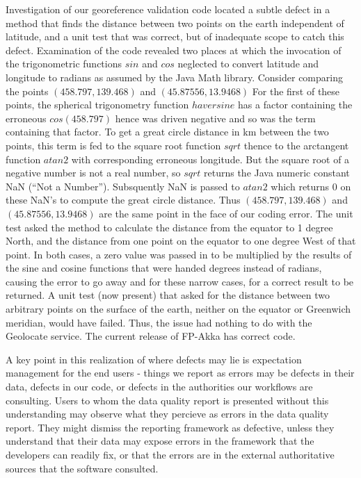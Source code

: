 \documentclass{article}
\begin{document}
Investigation of our georeference validation code located a subtle defect in a method that finds the distance between two points on the earth independent of latitude, and a unit test that was correct, but of inadequate scope to catch this defect.  Examination of the code revealed two places at which the invocation of the trigonometric functions $sin$ and $cos$ neglected to convert latitude and longitude to radians as assumed by the Java Math library. Consider comparing the points $(458.797,139.468)$ and $(45.87556, 13.9468)$ 
For the first of these points, the spherical trigonometry function $haversine$ has a factor containing the erroneous
$cos(458.797)$ hence was driven negative and so was the term containing that factor. To get a great circle distance in km between the two points, this term is fed to the square root function $sqrt$ thence to the arctangent function $atan2$ with corresponding erroneous longitude. But the square root of a negative number is not a real number, so $sqrt$ returns the Java numeric constant NaN (``Not a Number'').  Subsquently NaN is passed to $atan2$ which returns $0$ on these NaN's to compute the great circle distance.  Thus  $(458.797,139.468)$ and $(45.87556, 13.9468)$ are the same point in the face of our coding error.  The unit test asked the method to calculate the distance from the equator to 1 degree North, and the distance from one point on the equator to one degree West of that point.  In both cases, a zero value was passed in to be multiplied by the results of the sine and cosine functions that were handed degrees instead of radians, causing the error to go away and for these narrow cases, for a correct result to be returned.  A unit test (now present) that asked for the distance between two arbitrary points on the surface of the earth, neither on the equator or Greenwich meridian, would have failed.  Thus, the issue had nothing to do with the Geolocate service. The current release of FP-Akka has correct code.

A key point in this realization of where defects may lie is expectation management for the end users - things we report as errors may be defects in their data, defects in our code, or defects in the authorities our workflows are consulting.  Users to whom the data quality report is presented without this understanding may observe what they percieve as errors in the data quality report. They might dismiss the reporting framework as defective, unless they understand that their data may expose errors in the framework that the developers can readily fix, or that the errors are in the external authoritative sources that the software consulted.  
\end{document}
